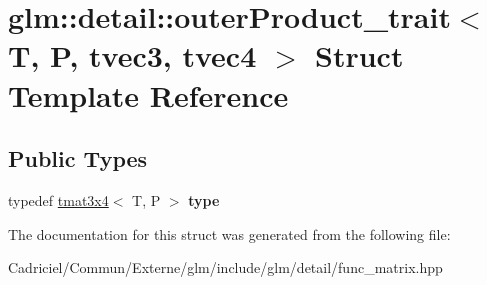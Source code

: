 \hypertarget{structglm_1_1detail_1_1outer_product__trait_3_01_t_00_01_p_00_01tvec3_00_01tvec4_01_4}{}\section{glm\+:\+:detail\+:\+:outer\+Product\+\_\+trait$<$ T, P, tvec3, tvec4 $>$ Struct Template Reference}
\label{structglm_1_1detail_1_1outer_product__trait_3_01_t_00_01_p_00_01tvec3_00_01tvec4_01_4}
\subsection*{Public Types}
\begin{DoxyCompactItemize}
\item 
typedef \hyperlink{structglm_1_1detail_1_1tmat3x4}{tmat3x4}$<$ T, P $>$ {\bfseries type}\hypertarget{structglm_1_1detail_1_1outer_product__trait_3_01_t_00_01_p_00_01tvec3_00_01tvec4_01_4_a14958bc1241fffaf223abab70496c56d}{}\label{structglm_1_1detail_1_1outer_product__trait_3_01_t_00_01_p_00_01tvec3_00_01tvec4_01_4_a14958bc1241fffaf223abab70496c56d}

\end{DoxyCompactItemize}


The documentation for this struct was generated from the following file\+:\begin{DoxyCompactItemize}
\item 
Cadriciel/\+Commun/\+Externe/glm/include/glm/detail/func\+\_\+matrix.\+hpp\end{DoxyCompactItemize}
